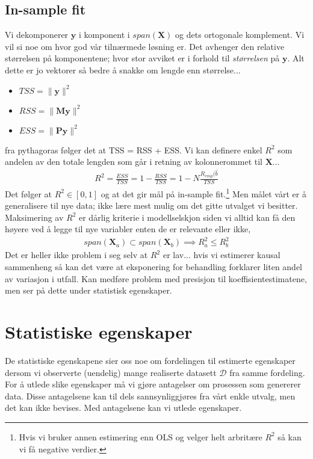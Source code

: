 \subsection{In-sample fit}
Vi dekomponerer $\mathbf{y}$ i komponent i $span(\mathbf{X})$ og dets ortogonale komplement. Vi vil si noe om hvor god vår tilnærmede løsning er. Det avhenger den relative størrelsen på komponentene; hvor stor avviket er i forhold til \textit{størrelsen} på $\mathbf{y}$. Alt dette er jo vektorer så bedre å snakke om lengde enn størrelse...
\begin{itemize}
\item $TSS = \lVert \mathbf{y}\rVert^2$
\item $RSS = \lVert \mathbf{M}\mathbf{y}\rVert^2$
\item $ESS = \lVert \mathbf{P}\mathbf{y}\rVert^2$
\end{itemize}
fra pythagoras følger det at TSS = RSS + ESS. Vi kan definere enkel $R^2$ som andelen av den totale lengden som går i retning av kolonnerommet til $\mathbf{X}$... 
\begin{align}
R^2 = \frac{ESS}{TSS} = 1-\frac{RSS}{TSS} = 1-N\frac{R_{emp}(\hat{b}}{TSS}
\end{align}
Det følger at $R^2 \in [0,1]$ og at det gir mål på in-sample fit.\footnote{Hvis vi bruker annen estimering enn OLS og velger helt arbritære $R^2$ så kan vi få negative verdier.} Men målet vårt er å generalisere til nye data; ikke lære mest mulig om det gitte utvalget vi besitter. Maksimering av $R^2$ er dårlig kriterie i modellselskjon siden vi alltid kan få den høyere ved å legge til nye variabler enten de er relevante eller ikke,
\begin{align}
span(\mathbf{X}_a) \subset span(\mathbf{X}_b) \implies R^2_a \leq R^2_b
\end{align}
Det er heller ikke problem i seg selv at $R^2$ er lav... hvis vi estimerer kausal sammenheng så kan det være at eksponering for behandling forklarer liten andel av variasjon i utfall. Kan medføre problem med presisjon til koeffisientestimatene, men ser på dette under statistisk egenskaper. 
\section{Statistiske egenskaper}
De statistiske egenskapene sier oss noe om fordelingen til estimerte egenskaper dersom vi observerte (uendelig) mange realiserte datasett $\mathcal{D}$ fra samme fordeling. For å utlede slike egenskaper må vi gjøre antagelser om prosessen som genererer data. Disse antagelsene kan til dels sannsynliggjøres fra vårt enkle utvalg, men det kan ikke bevises. Med antagelsene kan vi utlede egenskaper.

